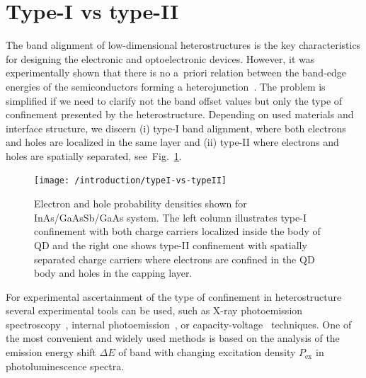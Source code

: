 \documentclass[
a4paper, %
11pt, %
onecolumn, %
openany, %
oldfontcommands,
]{memoir}
\begin{document}
\section{Type-I vs type-II}
The band alignment of low-dimensional heterostructures is the key characteristics for designing the electronic and optoelectronic devices. However, it was experimentally shown that there is no a~priori relation between the band-edge energies of the semiconductors forming a heterojunction~\cite{Kroemer1985}. The problem is simplified if we need to clarify not the band offset values but only the type of confinement presented by the heterostructure. Depending on used materials and interface structure, we discern (i) type-I band alignment, where both electrons and holes are localized in the same layer and (ii) type-II where electrons and holes are spatially separated, see~Fig.~\ref{fig:intr:typeI_vs_typeII}.
%
\begin{figure}
	\centering
	\texttt{[image: /introduction/typeI-vs-typeII]}
	\caption{Electron and hole probability densities shown for InAs/GaAsSb/GaAs system. The left column illustrates type-I confinement with both charge carriers localized inside the body of QD and the right one shows type-II confinement with spatially separated charge carriers where electrons are confined in the QD body and holes in the capping layer.}
	\label{fig:intr:typeI_vs_typeII}
\end{figure}

For experimental ascertainment of the type of confinement in heterostructure several experimental tools can be used, such as X-ray photoemission spectroscopy~\cite{Lin2014}, internal photoemission~\cite{Zhang_2012}, or capacity-voltage~\cite{Brounkov_1996} techniques. One of the most convenient and widely used methods is based on the analysis of the emission energy shift $\Delta E$ of band with changing excitation density $P_\mathrm{ex}$ in photoluminescence spectra. %
\end{document}
